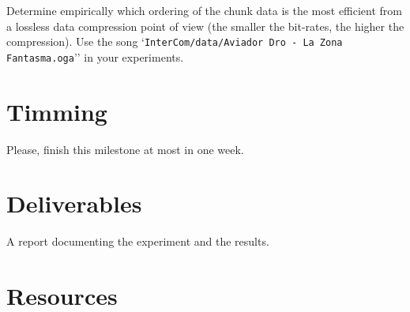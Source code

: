 Determine empirically which ordering of the chunk data is the most
efficient from a lossless data compression point of view (the smaller
the bit-rates, the higher the compression). Use the song
`\verb|InterCom/data/Aviador Dro - La Zona Fantasma.oga|'' in your
experiments.

\section{Timming}

Please, finish this milestone at most in one week.

\section{Deliverables}

A report documenting the experiment and the results.


\section{Resources}


